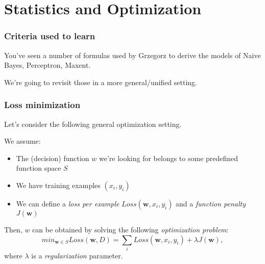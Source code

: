 \documentclass[usenames,dvipsnames]{beamer}
\newcommand{\w}{\mathbf{w}}
\newcommand{\voc}[1]{\emph{\color{ForestGreen}#1}}
\begin{document}
\section{Statistics and Optimization}

\begin{frame}\frametitle{Criteria used to learn}

You've seen a number of formulas used by Grzegorz to derive the models
of Naive Bayes, Perceptron, Maxent.

\vspace{0.4cm}
We're going to revisit those in a more general/unified setting.

\end{frame}


\begin{frame}\frametitle{Loss minimization}

Let's consider the following general optimization setting.

We assume:
\begin{itemize}
\item The (decision) function $w$ we're looking for belongs to some
  predefined function space $S$
\item We have training examples $(x_i, y_i)$
\item We can define a \voc{loss per example} $Loss(\w, x_i, y_i)$ and a
  \voc{function penalty} $J(\w)$
\end{itemize}

\vspace{0.4cm}
Then, $w$ can be obtained by solving the following \voc{optimization problem}:
\begin{equation*}
 min_{\w \in S} Loss(\w, D) = \sum_i Loss(\w, x_i, y_i) + \lambda J(\w),
\end{equation*}
where $\lambda$ is a \voc{regularization} parameter.
\end{frame}
\end{document}
